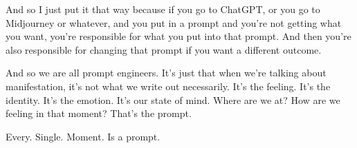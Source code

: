 \documentclass{article}
\begin{document}
And so I just put it that way because if you go to ChatGPT, or you go to Midjourney or whatever, and you put in a prompt and you're not getting what you want, you're responsible for what you put into that prompt. And then you're also responsible for changing that prompt if you want a different outcome. 

And so we are all prompt engineers. It's just that when we're talking about manifestation,
it's not what we write out necessarily. It's the feeling. It's the identity. It's the emotion. It's
our state of mind. Where are we at? How are we feeling in that moment? That's the prompt. 

Every. Single. Moment. Is a prompt.
\end{document}
